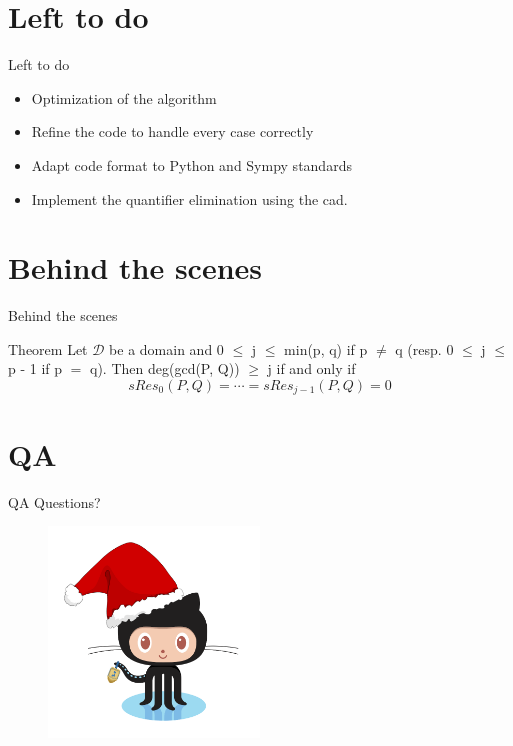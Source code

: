 \documentclass{beamer}
\begin{document}
\section{Left to do}
\begin{frame}{Left to do}
    \begin{itemize}
        \item Optimization of the algorithm
        \item Refine the code to handle every case correctly
        \item Adapt code format to Python and Sympy standards
        \item Implement the quantifier elimination using the cad.
    \end{itemize}
\end{frame}


\section{Behind the scenes}
\begin{frame}{Behind the scenes}
    \begin{block}{Theorem}
		Let $\mathcal{D}$ be a domain and 0 $\leq$ j $\leq$ min(p, q) if p $\neq$ q (resp. 0 $\leq$ j $\leq$ p - 1 if p $=$ q).  Then deg(gcd(P, Q)) $\geq$ j if and only if
        $$sRes_0(P, Q) = \cdots = sRes_{j-1}(P, Q) = 0$$
	\end{block}
\end{frame}


\section{QA}
\begin{frame}{QA}
    \centering
        Questions? 
    \begin{figure}
     \includegraphics[width=0.5\textwidth]{holiday-octocat.png}
    \end{figure}
   \end{frame}


    
\end{document}
